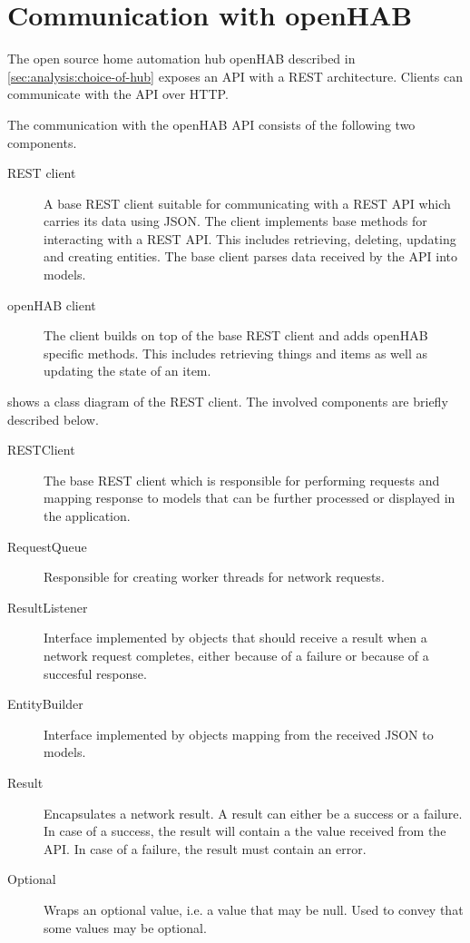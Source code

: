 \section{Communication with openHAB}
\label{sec:design:communication-with-openhab}

The open source home automation hub openHAB described in \cref{sec:analysis:choice-of-hub} exposes an API with a REST architecture. Clients can communicate with the API over HTTP.

The communication with the openHAB API consists of the following two components.

\begin{description}
\item[REST client] A base REST client suitable for communicating with a REST API which carries its data using JSON. The client implements base methods for interacting with a REST API. This includes retrieving, deleting, updating and creating entities. The base client parses data received by the API into models.
\item[openHAB client] The client builds on top of the base REST client and adds openHAB specific methods. This includes retrieving things and items as well as updating the state of an item.
\end{description}

 shows a class diagram of the REST client. The involved components are briefly described below.

\begin{description}
\item[RESTClient] The base REST client which is responsible for performing requests and mapping response to models that can be further processed or displayed in the application.
\item[RequestQueue] Responsible for creating worker threads for network requests.
\item[ResultListener] Interface implemented by objects that should receive a result when a network request completes, either because of a failure or because of a succesful response.
\item[EntityBuilder] Interface implemented by objects mapping from the received JSON to models.
\item[Result] Encapsulates a network result. A result can either be a success or a failure. In case of a success, the result will contain a the value received from the API. In case of a failure, the result must contain an error.
\item[Optional] Wraps an optional value, i.e. a value that may be null. Used to convey that some values may be optional.
\end{description}

